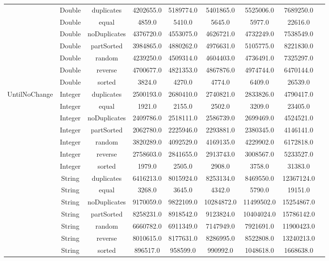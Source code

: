\documentclass{article}
\begin{document}
\begin{table}[H]
\begin{tabular}{|c|c|c|c|c|c|c|c|c|}
        & Double & duplicates & 4202655.0 & 5189774.0 & 5401865.0 & 5525006.0 & 7689250.0 \\
        & Double & equal & 4859.0 & 5410.0 & 5645.0 & 5977.0 & 22616.0 \\
        & Double & noDuplicates & 4376720.0 & 4553075.0 & 4626721.0 & 4732249.0 & 7538549.0 \\
        & Double & partSorted & 3984865.0 & 4880262.0 & 4976631.0 & 5105775.0 & 8221830.0 \\
        & Double & random & 4239250.0 & 4509314.0 & 4604403.0 & 4736491.0 & 7325297.0 \\
        & Double & reverse & 4700677.0 & 4821353.0 & 4867876.0 & 4974744.0 & 6470144.0 \\
        & Double & sorted & 3824.0 & 4270.0 & 4774.0 & 6409.0 & 26539.0 \\
        UntilNoChange
        & Integer & duplicates & 2500193.0 & 2680410.0 & 2740821.0 & 2833826.0 & 4790417.0 \\
        & Integer & equal & 1921.0 & 2155.0 & 2502.0 & 3209.0 & 23405.0 \\
        & Integer & noDuplicates & 2409786.0 & 2518111.0 & 2586739.0 & 2699469.0 & 4524521.0 \\
        & Integer & partSorted & 2062780.0 & 2225946.0 & 2293881.0 & 2380345.0 & 4146141.0 \\
        & Integer & random & 3820289.0 & 4092529.0 & 4169135.0 & 4229902.0 & 6172818.0 \\
        & Integer & reverse & 2758603.0 & 2841655.0 & 2913743.0 & 3008567.0 & 5233527.0 \\
        & Integer & sorted & 1979.0 & 2505.0 & 2908.0 & 3758.0 & 31383.0 \\
        
        & String & duplicates & 6416213.0 & 8015924.0 & 8253134.0 & 8469550.0 & 12367124.0 \\
        & String & equal & 3268.0 & 3645.0 & 4342.0 & 5790.0 & 19151.0 \\
        & String & noDuplicates & 9170059.0 & 9822109.0 & 10284872.0 & 11499502.0 & 15254867.0 \\
        & String & partSorted & 8258231.0 & 8918542.0 & 9123824.0 & 10404024.0 & 15786142.0 \\
        & String & random & 6660782.0 & 6911349.0 & 7147949.0 & 7921691.0 & 11900423.0 \\
        & String & reverse & 8010615.0 & 8177631.0 & 8286995.0 & 8522808.0 & 13240213.0 \\
        & String & sorted & 896517.0 & 958599.0 & 990992.0 & 1048618.0 & 1668638.0 \\
        

\end{tabular}
\end{table}
\end{document}
